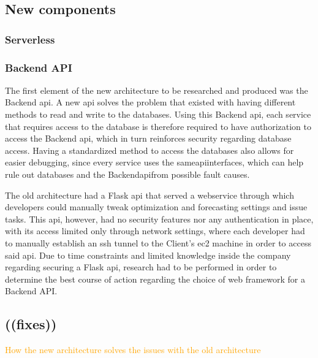 


\subsection{New components}\label{methodology:ss:new-components-new-arch}

\subsubsection{Serverless}\label{methodology:sss:serverless}


\subsubsection{Backend API}\label{methodology:sss:backendapi}
The first element of the new architecture to be researched and produced was the Backend \gls{api}. A new \gls{api} solves the problem that existed with having different methods to read and write to the databases. Using this Backend \gls{api}, each service that requires access to the database is therefore required to have authorization to access the Backend \gls{api}, which in turn reinforces security regarding database access. Having a standardized method to access the databases also allows for easier debugging, since every service uses the same\gls{api}interfaces, which can help rule out databases and the Backend\gls{api}from possible fault causes.

The old architecture had a Flask \gls{api} that served a webservice through which developers could manually tweak optimization and forecasting settings and issue tasks. This api, however, had no security features nor any authentication in place, with its access limited only through network settings, where each developer had to manually establish an \gls{ssh} tunnel to the Client's \gls{ec2} machine in order to access said api. Due to time constraints and limited knowledge inside the company regarding securing a Flask api, research had to be performed in order to determine the best course of action regarding the choice of web framework for a Backend API.

\subsection{((fixes))}\label{methodology:ss:fixes}
\textcolor{orange}{How the new architecture solves the issues with the old architecture}



